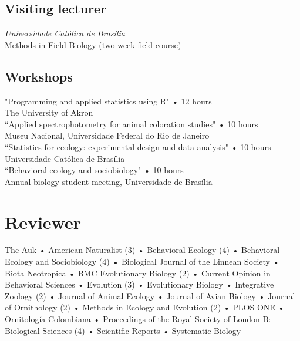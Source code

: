 \documentclass[10pt]{article}
\newcommand{\years}[1]{\marginnote{\raggedleft\scriptsize #1}}
\begin{document}
\subsection*{Visiting lecturer}
\emph{Universidade Católica de Brasília}\\
\years{2008} Methods in Field Biology (two-week field course)

\subsection*{Workshops}

\years{2013} "Programming and applied statistics using R" • 12 hours\\ The University of Akron\\

\years{2010} “Applied spectrophotometry for animal coloration studies" • 10 hours\\ Museu Nacional, Universidade Federal do Rio de Janeiro\\

\years{2008} “Statistics for ecology: experimental design and data analysis" • 10 hours\\ Universidade Católica de Brasília\\

\years{2006} “Behavioral ecology and sociobiology" • 10 hours\\ Annual biology student meeting, Universidade de Brasília



\section*{Reviewer}
The Auk • American Naturalist (3) • Behavioral Ecology (4) • Behavioral Ecology and Sociobiology (4) • Biological Journal of the Linnean Society • Biota Neotropica • \textsc{BMC} Evolutionary Biology (2) • Current Opinion in Behavioral Sciences • Evolution (3) • Evolutionary Biology • Integrative Zoology (2) • Journal of Animal Ecology • Journal of Avian Biology • Journal of Ornithology (2) • Methods in Ecology and Evolution (2) • \textsc{PLOS ONE} • Ornitolog\'{i}a Colombiana • Proceedings of the Royal Society of London B: Biological Sciences (4) • Scientific Reports • Systematic Biology\\
\end{document}
